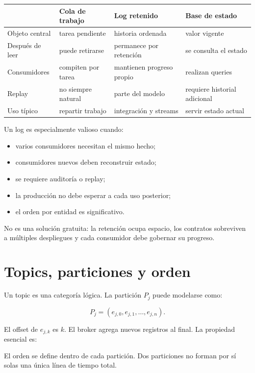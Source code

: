 \documentclass[variant=apuntes,cover=institutional,mode=screen]{ua-engineering-v6-article}
\begin{document}
\begin{center}
\small
\begin{tabular}{p{}p{}p{}p{}}
\toprule
 & Cola de trabajo & Log retenido & Base de estado \\
\midrule
Objeto central & tarea pendiente & historia ordenada & valor vigente \\
Después de leer & puede retirarse & permanece por retención & se consulta el estado \\
Consumidores & compiten por tarea & mantienen progreso propio & realizan queries \\
Replay & no siempre natural & parte del modelo & requiere historial adicional \\
Uso típico & repartir trabajo & integración y streams & servir estado actual \\
\bottomrule
\end{tabular}
\end{center}

Un log es especialmente valioso cuando:

\begin{itemize}
\item varios consumidores necesitan el mismo hecho;
\item consumidores nuevos deben reconstruir estado;
\item se requiere auditoría o replay;
\item la producción no debe esperar a cada uso posterior;
\item el orden por entidad es significativo.
\end{itemize}

No es una solución gratuita: la retención ocupa espacio, los contratos sobreviven a múltiples despliegues y cada consumidor debe gobernar su progreso.

\section{Topics, particiones y orden}

Un topic es una categoría lógica. La partición $P_j$ puede modelarse como:

\[
P_j=(e_{j,0},e_{j,1},\ldots,e_{j,n}).
\]

El offset de $e_{j,k}$ es $k$. El broker agrega nuevos registros al final. La propiedad esencial es:

\begin{uakeybox}
El orden se define dentro de cada partición. Dos particiones no forman por sí solas una única línea de tiempo total.
\end{uakeybox}
\end{document}
